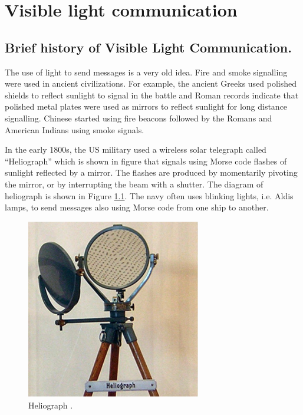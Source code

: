 \chapter{Visible light communication}

\section {Brief history of Visible Light Communication.}
The use of light to send messages is a very old idea. Fire and smoke signalling were used in ancient civilizations. For example, the ancient Greeks used polished shields to reflect sunlight to signal in the battle and Roman records indicate that polished metal plates were used as mirrors to reflect sunlight for long distance signalling. Chinese started using fire beacons followed by the Romans and American Indians using
smoke signals.

In the early 1800s, the US military used a wireless solar telegraph called “Heliograph” which is shown in figure that signals using
Morse code flashes of sunlight reflected by a mirror. The flashes are produced by momentarily pivoting the mirror, or by interrupting the beam with a shutter. The diagram of heliograph is shown in Figure \ref{helio}. The navy often uses blinking lights, i.e. Aldis lamps, to
send messages also using Morse code from one ship to another.
\begin{figure}[h]
\begin{center}
\includegraphics[width=3.0in]{heliograph.eps}
\caption{Heliograph \cite{r17}.} \label{helio}
\end{center}
\end{figure}

\pagebreak

